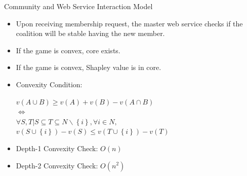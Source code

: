 \documentclass{beamer}
\begin{document}
\begin{frame}{Community and Web Service Interaction Model}


    \begin{itemize}
        \item Upon receiving membership request, the master web service checks if the coalition will be stable having the new member.
        \item If the game is convex, core exists.
        \item If the game is convex, Shapley value is in core.
        \item Convexity Condition:
        \begin{center}
          $v(A \cup B) \geq v(A) + v(B) - v(A \cap B)$ \\
          $\Leftrightarrow$  \\
          $\forall S,T | S \subseteq T \subseteq N \backslash \left\{i\right\}, \forall i \in N,$ \\
          {\color{blue} $v(S \cup \left\{i\right\}) - v(S) \leq v (T \cup \left\{i\right\}) - v(T)$ }
        \end{center}
        \item Depth-1 Convexity Check: $O(n)$
        \item Depth-2 Convexity Check: $O(n^2)$
    \end{itemize}
       	
\end{frame}
\end{document}
